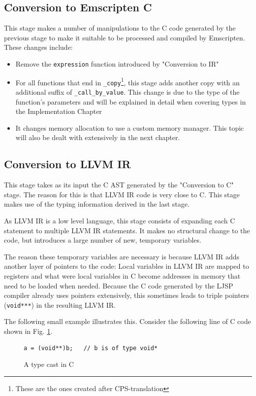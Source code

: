 \documentclass[11pt]{report}
\begin{document}
\subsection{Conversion to Emscripten C}
This stage makes a number of manipulations to the C code generated by the previous stage to make it suitable to be processed and compiled by Emscripten. These changes include:
\begin{itemize}
\item Remove the \texttt{expression} function introduced by "Conversion to IR"
\item For all functions that end in \texttt{_copy}\footnote{These are the ones created after CPS-translation}, this stage adds another copy with an additional suffix of \texttt{_call_by_value}. This change is due to the type of the function's parameters and will be explained in detail when covering types in the Implementation Chapter
\item It changes memory allocation to use a custom memory manager. This topic will also be dealt with extensively in the next chapter.
\end{itemize}

\subsection{Conversion to LLVM IR}
This stage takes as its input the C AST generated by the "Conversion to C" stage. The reason for this is that LLVM IR code is very close to C. This stage makes use of the typing information derived in the last stage.

As LLVM IR is a low level language, this stage consists of expanding each C statement to multiple LLVM IR statements. It makes no structural change to the code, but introduces a large number of new, temporary variables.

The reason these temporary variables are necessary is because LLVM IR adds another layer of pointers to the code: Local variables in LLVM IR are mapped to registers and what were local variables in C become addresses in memory that need to be loaded when needed. Because the C code generated by the LJSP compiler already uses pointers extensively, this sometimes leads to triple pointers (\texttt{void***}) in the resulting LLVM IR.

The following small example illustrates this. Consider the following line of C code shown in Fig. \ref{convllvmir1}.
\begin{figure}[ht]
\begin{lstlisting}
a = (void**)b;   // b is of type void*
\end{lstlisting}
\caption{A type cast in C}
\label{convllvmir1}
\end{figure}
\end{document}
